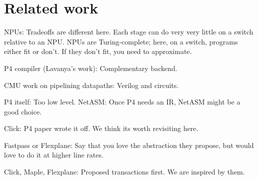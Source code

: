 \section{Related work}
\label{s:related}
NPUs: Tradeoffs are different here. Each stage can do very very little on a switch relative to an NPU. NPUs are Turing-complete; here, on a switch, programs either fit or don't. If they don't fit, you need to approximate.

P4 compiler (Lavanya's work): Complementary backend.

CMU work on pipelining datapaths: Verilog and circuits.

P4 itself: Too low level. NetASM: Once P4 needs an IR, NetASM might be a good choice.

Click: P4 paper wrote it off. We think its worth revisiting here.

Fastpass or Flexplane: Say that you love the abstraction they propose,
but would love to do it at higher line rates.

Click, Maple, Flexplane: Proposed transactions first. We are inspired by them.

